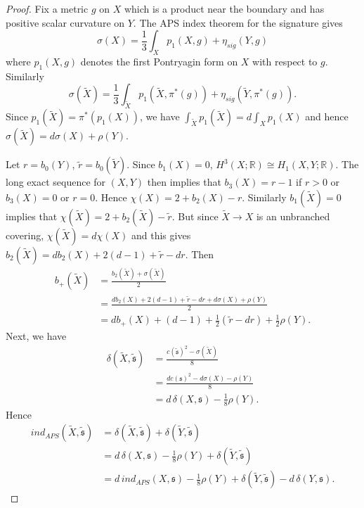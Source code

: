 \documentclass[10pt,a4paper]{amsart}
\begin{document}
\begin{proof}
Fix a metric $g$ on $X$ which is a product near the boundary and has positive scalar curvature on $Y$. The APS index theorem for the signature gives
\[
\sigma(X) = \frac{1}{3} \int_X p_1(X,g) + \eta_{sig}(Y,g)
\]
where $p_1(X,g)$ denotes the first Pontryagin form on $X$ with respect to $g$. Similarly
\[
\sigma(\widetilde{X}) = \frac{1}{3} \int_{\widetilde{X}} p_1(\widetilde{X}, \pi^*(g)) + \eta_{sig}(\widetilde{Y},\pi^*(g)).
\]
Since $p_1(\widetilde{X}) = \pi^*(p_1(X))$, we have $\int_{\widetilde{X}} p_1(\widetilde{X}) = d \int_X p_1(X)$ and hence $\sigma(\widetilde{X}) = d \sigma(X) + \rho(Y)$.

Let $r = b_0(Y)$, $\widetilde{r} = b_0(\widetilde{Y})$. Since $b_1(X) = 0$, $H^3(X ; \mathbb{R}) \cong H_1(X , Y ; \mathbb{R})$. The long exact sequence for $(X,Y)$ then implies that $b_3(X) = r-1$ if $r > 0$ or $b_3(X) = 0$ or $r=0$. Hence $\chi(X) = 2 + b_2(X) - r$. Similarly $b_1(\widetilde{X}) = 0$ implies that $\chi(\widetilde{X}) = 2 + b_2(\widetilde{X}) - \widetilde{r}$. But since $\widetilde{X} \to X$ is an unbranched covering, $\chi(\widetilde{X}) = d \chi(X)$ and this gives $b_2(\widetilde{X}) = d b_2(X) + 2(d-1) + \widetilde{r} - dr$. Then
\begin{align*}
b_+(\widetilde{X}) &= \frac{ b_2(\widetilde{X}) + \sigma(\widetilde{X}) }{2} \\
&= \frac{ d b_2(X) + 2(d-1) + \widetilde{r} - dr + d \sigma(X) + \rho(Y) }{2} \\
&= d b_+(X) + (d-1) + \frac{1}{2}(\widetilde{r} - dr) + \frac{1}{2}\rho(Y).
\end{align*}
Next, we have
\begin{align*}
\delta( \widetilde{X} , \widetilde{\mathfrak{s}}) &= \frac{ c(\widetilde{\mathfrak{s}})^2 - \sigma(\widetilde{X}) }{8} \\
&= \frac{ d c(\mathfrak{s})^2 - d \sigma(X) - \rho(Y) }{8} \\
&= d \, \delta(X , \mathfrak{s}) - \frac{1}{8}\rho(Y).
\end{align*}
Hence
\begin{align*}
ind_{APS}( \widetilde{X} , \widetilde{\mathfrak{s}}) &= \delta(\widetilde{X} , \widetilde{\mathfrak{s}}) + \delta(\widetilde{Y} , \widetilde{\mathfrak{s}}) \\
&= d \, \delta(X , \mathfrak{s}) - \frac{1}{8}\rho(Y) + \delta(\widetilde{Y} , \widetilde{\mathfrak{s}}) \\
&= d \, ind_{APS}(X , \mathfrak{s}) - \frac{1}{8}\rho(Y) + \delta(\widetilde{Y} , \widetilde{\mathfrak{s}}) - d \, \delta(Y , \mathfrak{s}).

\end{align*}
\end{proof}
\end{document}
